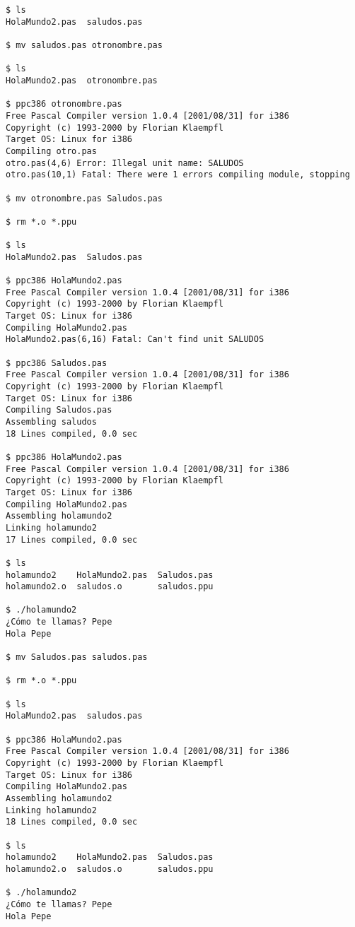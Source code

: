 \begin{verbatim}
$ ls
HolaMundo2.pas  saludos.pas

$ mv saludos.pas otronombre.pas

$ ls
HolaMundo2.pas  otronombre.pas

$ ppc386 otronombre.pas
Free Pascal Compiler version 1.0.4 [2001/08/31] for i386
Copyright (c) 1993-2000 by Florian Klaempfl
Target OS: Linux for i386
Compiling otro.pas
otro.pas(4,6) Error: Illegal unit name: SALUDOS
otro.pas(10,1) Fatal: There were 1 errors compiling module, stopping

$ mv otronombre.pas Saludos.pas

$ rm *.o *.ppu

$ ls
HolaMundo2.pas  Saludos.pas

$ ppc386 HolaMundo2.pas
Free Pascal Compiler version 1.0.4 [2001/08/31] for i386
Copyright (c) 1993-2000 by Florian Klaempfl
Target OS: Linux for i386
Compiling HolaMundo2.pas
HolaMundo2.pas(6,16) Fatal: Can't find unit SALUDOS

$ ppc386 Saludos.pas 
Free Pascal Compiler version 1.0.4 [2001/08/31] for i386
Copyright (c) 1993-2000 by Florian Klaempfl
Target OS: Linux for i386
Compiling Saludos.pas
Assembling saludos
18 Lines compiled, 0.0 sec

$ ppc386 HolaMundo2.pas
Free Pascal Compiler version 1.0.4 [2001/08/31] for i386
Copyright (c) 1993-2000 by Florian Klaempfl
Target OS: Linux for i386
Compiling HolaMundo2.pas
Assembling holamundo2
Linking holamundo2
17 Lines compiled, 0.0 sec

$ ls
holamundo2    HolaMundo2.pas  Saludos.pas
holamundo2.o  saludos.o       saludos.ppu

$ ./holamundo2
¿Cómo te llamas? Pepe
Hola Pepe

$ mv Saludos.pas saludos.pas

$ rm *.o *.ppu

$ ls
HolaMundo2.pas  saludos.pas

$ ppc386 HolaMundo2.pas 
Free Pascal Compiler version 1.0.4 [2001/08/31] for i386
Copyright (c) 1993-2000 by Florian Klaempfl
Target OS: Linux for i386
Compiling HolaMundo2.pas
Assembling holamundo2
Linking holamundo2
18 Lines compiled, 0.0 sec

$ ls
holamundo2    HolaMundo2.pas  Saludos.pas
holamundo2.o  saludos.o       saludos.ppu

$ ./holamundo2
¿Cómo te llamas? Pepe
Hola Pepe
\end{verbatim}


